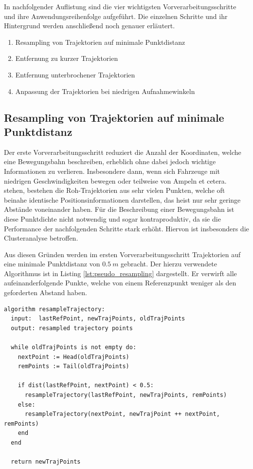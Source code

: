 In nachfolgender Auflistung sind die vier wichtigsten Vorverarbeitungsschritte und ihre Anwendungsreihenfolge
aufgeführt. Die einzelnen Schritte und ihr Hintergrund werden anschließend noch genauer erläutert.

\begin{enumerate}
    \item Resampling von Trajektorien auf minimale Punktdistanz
    \item Entfernung zu kurzer Trajektorien
    \item Entfernung unterbrochener Trajektorien
    \item Anpassung der Trajektorien bei niedrigen Aufnahmewinkeln
\end{enumerate}

\subsection{Resampling von Trajektorien auf minimale Punktdistanz}
Der erste Vorverarbeitungsschritt reduziert die Anzahl der Koordinaten, welche eine Bewegungsbahn beschreiben, erheblich
ohne dabei jedoch wichtige Informationen zu verlieren. Insbesondere dann, wenn sich Fahrzeuge mit niedrigen
Geschwindigkeiten bewegen oder teilweise von Ampeln et cetera. stehen, bestehen die Roh-Trajektorien aus sehr vielen
Punkten, welche oft beinahe identische Positionsinformationen darstellen, das heist nur sehr geringe
Abstände voneinander haben. Für die Beschreibung einer Bewegungsbahn ist diese Punktdichte nicht notwendig
und sogar kontraproduktiv, da sie die Performance der nachfolgenden Schritte stark erhöht. Hiervon ist insbesonders
die Clusteranalyse betroffen.

Aus diesen Gründen werden im ersten Vorverarbeitungsschritt Trajektorien auf eine minimale Punktdistanz
von $0.5\ m$ gebracht. Der hierzu verwendete Algorithmus ist in Listing \ref{lst:pseudo_resampling} dargestellt.
Er verwirft alle aufeinanderfolgende Punkte, welche von einem Referenzpunkt weniger als den geforderten Abstand haben.
\begin{lstlisting}[caption=Pseudocode Trajektorie Resampling, language=Pseudo, label=lst:pseudo_resampling]
algorithm resampleTrajectory:
  input:  lastRefPoint, newTrajPoints, oldTrajPoints
  output: resampled trajectory points

  while oldTrajPoints is not empty do:
    nextPoint := Head(oldTrajPoints)
    remPoints := Tail(oldTrajPoints)

    if dist(lastRefPoint, nextPoint) < 0.5:
      resampleTrajectory(lastRefPoint, newTrajPoints, remPoints)
    else:
      resampleTrajectory(nextPoint, newTrajPoint ++ nextPoint, remPoints)
    end
  end

  return newTrajPoints
\end{lstlisting}

